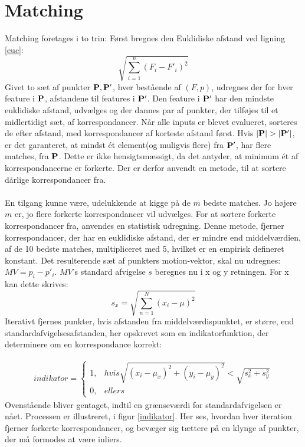\section{Matching}
Matching foretages i to trin: Først bregnes den Euklidiske afstand ved ligning \eqref{euc}:
\begin{equation}
\sqrt{\sum\limits_{i=1}^n(F_i-F'_i)^2}
\label{euc}
\end{equation}
Givet to sæt af punkter $\bold{P}, \bold{P}'$, hver bestående af $(F, p)$, udregnes der for hver feature i $\bold{P}$, afstandene til features i $\bold{P}'$. Den feature i $\bold{P}'$ har den mindste euklidiske afstand, udvælges og der dannes par af punkter, der tilføjes til et midlertidigt sæt, af korrespondancer. Når alle inputs er blevet evalueret, sorteres de efter afstand, med korrespondancer af korteste afstand først. Hvis $|\bold{P}| > |\bold{P}'|$, er det garanteret, at mindst ét element(og muligvis flere) fra $\bold{P}'$, har flere matches, fra $\bold{P}$. Dette er ikke hensigtsmæssigt, da det antyder, at minimum ét af korrespondancerne er forkerte. Der er derfor anvendt en metode, til at sortere dårlige korrespondancer fra.
\\
\\
En tilgang kunne være, udelukkende at kigge på de $m$ bedste matches. Jo højere $m$ er, jo flere forkerte korrespondancer vil udvælges. For at sortere forkerte korrespondancer fra, anvendes en statistisk udregning. Denne metode, fjerner korrespondancer, der har en euklidiske afstand, der er mindre end middelværdien, af de 10 bedste matches, multipliceret med 5, hvilket er en empirisk defineret konstant. Det resulterende sæt af punkters motion-vektor, skal nu udregnes: $MV = p_i - p'_i$. 
$MV$'s standard afvigelse $s$ beregnes nu i x og y retningen. For x kan dette skrives: 
\begin{equation}
s_x = \sqrt{ \sum \limits_{n=1}^N (x_i  - \mu)^2 }
\label{pis}
\end{equation}
Iterativt fjernes punkter, hvis afstanden fra middelværdispunktet, er større, end standardafvigelsesafstanden, her opskrevet som en indikatorfunktion, der determinere om en korrespondance korrekt:

\begin{equation}
\begin{split}
indikator = 
\begin{cases}
1,&hvis \sqrt{(x_i - \mu_x)^2 + (y_i - \mu_y)^2} < \sqrt{s_x^2 + s_y^2} \\
0,& ellers
\end{cases}
\end{split}
\label{indikator}
\end{equation}
Ovenstående bliver gentaget, indtil en grænseværdi for standardafvigelsen er nået. Processen er illustreret, i figur \eqref{indikator}. Her ses, hvordan hver iteration fjerner forkerte korrespondancer, og bevæger sig tættere på en klynge af punkter, der må formodes at være inliers.
